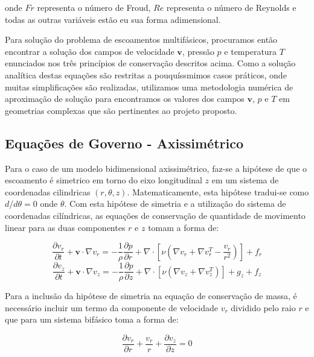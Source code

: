 \documentclass[a4paper,portuges,12pt]{article}
\newcommand{\vvet}{\mathbf{v}}
\begin{document}
\noindent onde $Fr$ representa o número de Froud, $Re$ representa o
número de Reynolds e todas as outras variáveis estão eu sua forma
adimensional.

Para solução do problema de escoamentos multifásicos, procuramos então
encontrar a solução dos campos de velocidade $\vvet$, pressão $p$ e
temperatura $T$ enunciados nos três princípios de conservação descritos
acima. Como a solução analítica destas equações são restritas a
pouquíssmimos casos práticos, onde muitas simplificações são realizadas,
utilizamos uma metodologia numérica de aproximação de solução para
encontramos os valores dos campos $\vvet$, $p$ e $T$ em geometrias
complexas que são pertinentes ao projeto proposto. 

\subsection{Equações de Governo - Axissimétrico}
Para o caso de um modelo bidimensional axissimétrico, faz-se a hipótese
de que o escoamento é simetrico em torno do eixo longitudinal $z$ em um
sistema de coordenadas cilindricas $(r,\theta,z)$. Matematicamente, esta
hipótese tradui-se como $d/d\theta=0$ onde $\theta$. Com esta hipótese
de simetria e a utilização do sistema de coordenadas cilíndricas, as
equações de conservação de quantidade de movimento linear para as duas
componentes $r$ e $z$ tomam a forma de:

\begin{equation}
	\frac{\partial v_r}{\partial t} + \vvet \cdot \nabla v_r
	= 
	- \frac{1}{\rho} \frac{\partial p}{\partial r} +
	\nabla \cdot [\nu(\nabla v_r + \nabla v_r^T - \frac{v_r}{r^2})] 
	+ 
	f_r
\label{eq:NSAxi1}
\end{equation}
\begin{equation}
	\frac{\partial v_z}{\partial t} + \vvet \cdot \nabla v_z
	= 
	- \frac{1}{\rho} \frac{\partial p}{\partial z} +
	\nabla \cdot [\nu(\nabla v_z + \nabla v_z^T)] + 
	g_z 
	+ 
	f_z
\label{eq:NSAxi}
\end{equation}

Para a inclusão da hipótese de simetria na equação de conservação de
massa, é necessário incluir um termo da componente de velocidade $v_r$
dividido pelo raio $r$ e que para um sistema bifásico toma a forma de:

\begin{equation}
	\frac{\partial v_r}{\partial r}
	+
	\frac{v_r}{r}
	+
	\frac{\partial v_z}{\partial z}  
	= 
	0
	\label{eq:cm9}
\end{equation}
\end{document}
